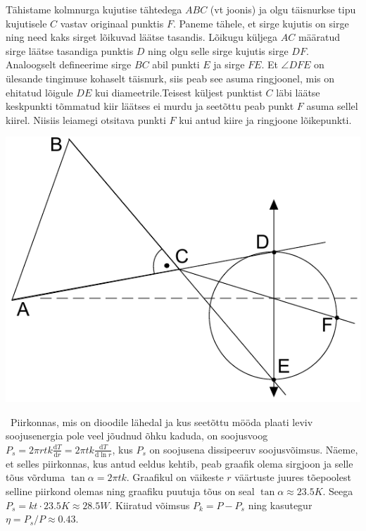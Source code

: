 \documentclass[10pt]{article}
\begin{document}
\solu
Tähistame kolmnurga kujutise tähtedega $ABC$ (vt joonis) ja olgu täisnurkse tipu kujutisele $C$ vastav originaal punktis $F$. Paneme tähele, et sirge kujutis on sirge ning need kaks sirget lõikuvad läätse tasandis. Lõikugu küljega $AC$ määratud sirge läätse tasandiga punktis $D$ ning olgu selle sirge kujutis sirge $DF$. Analoogselt defineerime sirge 
$BC$ abil punkti $E$ ja sirge $FE$. Et $\angle DFE$ on ülesande tingimuse kohaselt täisnurk, siis peab see asuma ringjoonel, mis on ehitatud lõigule $DE$ kui diameetrile.Teisest küljest punktist $C$ läbi läätse keskpunkti tõmmatud kiir läätses ei murdu ja seetõttu peab punkt $F$ asuma sellel kiirel. Niisiis leiamegi otsitava punkti $F$ kui antud kiire ja ringjoone lõikepunkti.
\begin{center}
	\includegraphics[width=0.5\linewidth]{2018-lahg-08-yl.pdf}
\end{center}
\probend
\bigskip


\solu
\
Piirkonnas, mis on dioodile lähedal ja kus seetõttu mööda plaati leviv soojusenergia pole veel jõudnud õhku kaduda, on soojusvoog $P_s=2\pi rtk \frac{\mathrm d T}{\mathrm d r}=2\pi tk \frac{\mathrm d T}{\mathrm d \ln r}$, kus $P_s$ on soojusena dissipeeruv soojusvõimsus. Näeme, et selles piirkonnas, kus antud eeldus kehtib, peab graafik olema sirgjoon ja selle tõus võrduma $\tan\alpha=2\pi tk$. Graafikul on väikeste $r$ väärtuste juures tõepoolest selline piirkond olemas ning graafiku puutuja tõus on seal $\tan\alpha\approx\SI{23.5}K$. Seega $P_s=kt\cdot \SI{23.5}K\approx \SI{28.5}W$. Kiiratud võimsus $P_k=P-P_s$ ning kasutegur $\eta=P_s/P\approx 0.43$.
\probend
\bigskip

\end{document}
